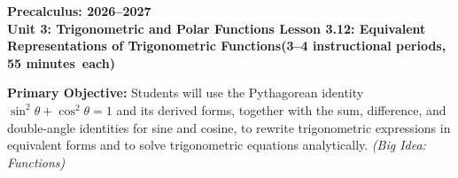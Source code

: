 \documentclass[10pt]{article}
\newcommand{\CourseName}{Precalculus}
\newcommand{\SchoolYear}{2026--2027}
\newcommand{\MeetingLength}{55 minutes}
\newcommand{\UnitNumberName}{Unit 3: Trigonometric and Polar Functions \quad}
\newcommand{\LessonNumberName}{Lesson 3.12: Equivalent Representations of Trigonometric Functions}
\begin{document}
\begin{center}
  {\Large\bfseries \CourseName: \SchoolYear} \\[4pt]
  {\small\bfseries \UnitNumberName \LessonNumberName \quad (3--4 instructional periods, \MeetingLength\ each)}
\end{center}

\begin{tcolorbox}[colback=sky, colframe=navy, boxrule=0.9pt, arc=2mm,
    left=2mm, right=2mm, top=1.5mm, bottom=1.5mm]
  \textbf{Primary Objective:} Students will use the Pythagorean identity
  $\sin^2\theta + \cos^2\theta = 1$ and its derived forms, together with the
  sum, difference, and double-angle identities for sine and cosine, to rewrite
  trigonometric expressions in equivalent forms and to solve trigonometric
  equations analytically.
  \textit{(Big Idea: Functions)}
\end{tcolorbox}

\vspace{0.08in}
\end{document}

